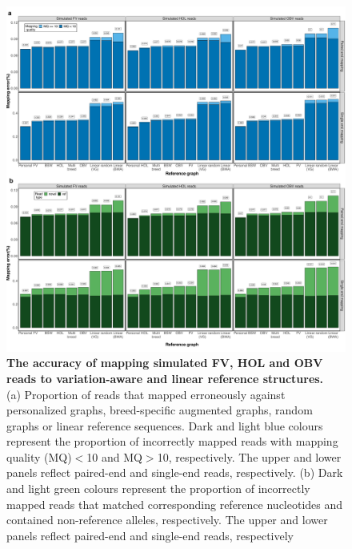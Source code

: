 \documentclass[../main.tex]{subfiles}
\begin{document}
\begin{flushleft}
\begin{figure}[!htb]
    \centering
    \includegraphics[width=\textwidth]{paper2/supplement/sp310.pdf}
    \caption[The accuracy of mapping simulated FV, HOL and OBV reads]{\textbf{The accuracy of mapping simulated FV, HOL and OBV reads to
    variation-aware and linear reference structures.} \\
    \small{(a) Proportion of reads that
    mapped erroneously against personalized graphs, breed-specific augmented graphs,
    random graphs or linear reference sequences. Dark and light blue colours represent
    the proportion of incorrectly mapped reads with mapping quality (MQ)$<$10 and
    MQ$>$10, respectively. The upper and lower panels reflect paired-end and single-end
    reads, respectively. (b) Dark and light green colours represent the proportion of
    incorrectly mapped reads that matched corresponding reference nucleotides and
    contained non-reference alleles, respectively. The upper and lower panels reflect
    paired-end and single-end reads, respectively}}
    \label{sup_fig:s310}
\end{figure}


\end{flushleft}
\end{document}
